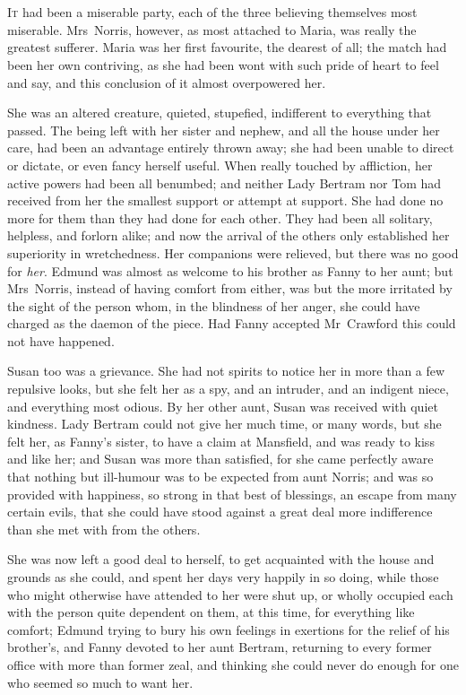 \chapter[Chapter \thechapter]{} 

 \lettrine[lraise=0.3]{I}{t} had been a miserable party, each of the three believing themselves most miserable. Mrs~Norris, however, as most attached to Maria, was really the greatest sufferer. Maria was her first favourite, the dearest of all; the match had been her own contriving, as she had been wont with such pride of heart to feel and say, and this conclusion of it almost overpowered her.

She was an altered creature, quieted, stupefied, indifferent to everything that passed. The being left with her sister and nephew, and all the house under her care, had been an advantage entirely thrown away; she had been unable to direct or dictate, or even fancy herself useful. When really touched by affliction, her active powers had been all benumbed; and neither Lady Bertram nor Tom had received from her the smallest support or attempt at support. She had done no more for them than they had done for each other. They had been all solitary, helpless, and forlorn alike; and now the arrival of the others only established her superiority in wretchedness. Her companions were relieved, but there was no good for \textit{her}. Edmund was almost as welcome to his brother as Fanny to her aunt; but Mrs~Norris, instead of having comfort from either, was but the more irritated by the sight of the person whom, in the blindness of her anger, she could have charged as the daemon of the piece. Had Fanny accepted Mr~Crawford this could not have happened.

Susan too was a grievance. She had not spirits to notice her in more than a few repulsive looks, but she felt her as a spy, and an intruder, and an indigent niece, and everything most odious. By her other aunt, Susan was received with quiet kindness. Lady Bertram could not give her much time, or many words, but she felt her, as Fanny's sister, to have a claim at Mansfield, and was ready to kiss and like her; and Susan was more than satisfied, for she came perfectly aware that nothing but ill-humour was to be expected from aunt Norris; and was so provided with happiness, so strong in that best of blessings, an escape from many certain evils, that she could have stood against a great deal more indifference than she met with from the others.

She was now left a good deal to herself, to get acquainted with the house and grounds as she could, and spent her days very happily in so doing, while those who might otherwise have attended to her were shut up, or wholly occupied each with the person quite dependent on them, at this time, for everything like comfort; Edmund trying to bury his own feelings in exertions for the relief of his brother's, and Fanny devoted to her aunt Bertram, returning to every former office with more than former zeal, and thinking she could never do enough for one who seemed so much to want her.

